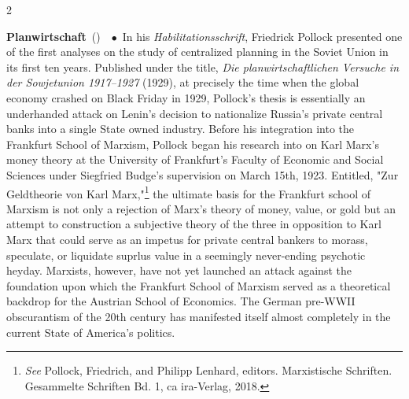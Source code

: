 \documentclass[10pt,a4paper,twoside]{article} %
\newcommand{\entry}[4]{\markboth{#1}{#1}\textbf{#1}\ {(#2)}\ \textit{#3}\ $\bullet$\ {#4}}  %
\begin{document}
\begin{multicols}{2}
\entry{Planwirtschaft} {} {} {In his \emph{Habilitationsschrift}, Friedrick Pollock presented one of the first analyses on the study of centralized planning in the Soviet Union in its first ten years. Published under the title, \emph{Die planwirtschaftlichen Versuche in der Sowjetunion 1917–1927} (1929), at precisely the time when the global economy crashed on Black Friday in 1929, Pollock's thesis is essentially an underhanded attack on Lenin's decision to nationalize Russia's private central banks into a single State owned industry. Before his integration into the Frankfurt School of Marxism, Pollock began his research into on Karl Marx's money theory at the University of Frankfurt's Faculty of Economic and Social Sciences under Siegfried Budge's supervision on March 15th, 1923. Entitled, "Zur Geldtheorie von Karl Marx,"\footnote{\emph{See} Pollock, Friedrich, and Philipp Lenhard, editors. Marxistische Schriften. Gesammelte Schriften Bd. 1, ca ira-Verlag, 2018.} the ultimate basis for the Frankfurt school of Marxism is not only a rejection of Marx's theory of money, value, or gold but an attempt to construction a subjective theory of the three in opposition to Karl Marx that could serve as an impetus for private central bankers to morass, speculate, or liquidate suprlus value in a seemingly never-ending psychotic heyday. Marxists, however, have not yet launched an attack against the foundation upon which the Frankfurt School of Marxism served as a theoretical backdrop for the Austrian School of Economics. The German pre-WWII obscurantism of the 20th century has manifested itself almost completely in the current State of America's politics.} 




\end{multicols}
\end{document}
